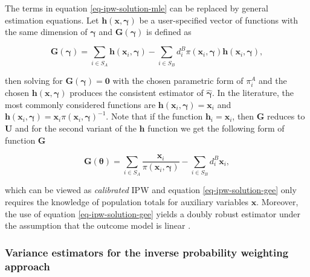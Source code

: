 \documentclass[
]{jss}
\begin{document}
The terms in equation \eqref{eq-ipw-solution-mle} can be replaced by
general estimation equations. Let
\(\boldsymbol{h}(\boldsymbol{x}, \boldsymbol{\gamma})\) be a
user-specified vector of functions with the same dimension of
\(\boldsymbol{\gamma}\) and \(\boldsymbol{G}(\boldsymbol{\gamma})\) is
defined as

\begin{equation}
\label{gee}
\boldsymbol{G}(\boldsymbol{\gamma})=\sum_{i \in S_A} \boldsymbol{h}\left(\boldsymbol{x}_i, \boldsymbol{\gamma}\right)-\sum_{i \in S_B} d_i^B \pi\left(\boldsymbol{x}_i, \boldsymbol{\gamma}\right) \boldsymbol{h}\left(\boldsymbol{x}_i, \boldsymbol{\gamma}\right),
\end{equation}

then solving for \(\boldsymbol{G}(\boldsymbol{\gamma})=\boldsymbol{0}\)
with the chosen parametric form of \(\pi_i^A\) and the chosen
\(\boldsymbol{h}(\boldsymbol{x},\boldsymbol{\gamma})\) produces the
consistent estimator of \(\hat{\boldsymbol{\gamma}}\). In the
literature, the most commonly considered functions are
\(\boldsymbol{h}\left(\boldsymbol{x}_i, \boldsymbol{\gamma}\right) = \boldsymbol{x}_i\)
and
\(\boldsymbol{h}\left(\boldsymbol{x}_i, \boldsymbol{\gamma}\right) = \boldsymbol{x}_i \pi\left(\boldsymbol{x}_i, \boldsymbol{\gamma}\right)^{-1}\).
Note that if the function \(\boldsymbol{h}_i=\boldsymbol{x}_i\), then
\(\boldsymbol{G}\) reduces to \(\boldsymbol{U}\) and for the second
variant of the \(\boldsymbol{h}\) function we get the following form of
function \(\boldsymbol{G}\)

\begin{equation}
\boldsymbol{G}(\boldsymbol{\theta}) = \sum_{i \in S_A} \frac{\boldsymbol{x}_i}{\pi\left(\boldsymbol{x}_i, \boldsymbol{\gamma}\right) }-\sum_{i \in S_B} d_i^B \boldsymbol{x}_i,
\label{eq-ipw-solution-gee}
\end{equation}

which can be viewed as \textit{calibrated} IPW and equation
\eqref{eq-ipw-solution-gee} only requires the knowledge of population
totals for auxiliary variables \(\boldsymbol{x}\). Moreover, the use of
equation \eqref{eq-ipw-solution-gee} yields a doubly robust estimator
under the assumption that the outcome model is linear
\citep{kim_theory_2012}.

\subsubsection{Variance estimators for the inverse probability weighting
approach}\label{variance-estimators-for-the-inverse-probability-weighting-approach}
\end{document}
